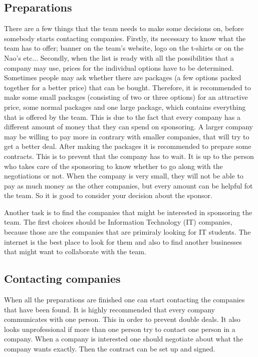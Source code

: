 \documentclass[a4paper]{article}
\begin{document}
\subsection{Preparations}
There are a few things that the team needs to make some decisions on, before somebody starts contacting companies. Firstly, its necessary to know what the team has to offer; banner on the team's website, logo on the t-shirts or on the Nao's etc... Secondly, when the list is ready with all the possibilities that a company may use, prices for the individual options have to be determined. Sometimes people may ask whether there are packages (a few options packed together for a better price) that can be bought. Therefore, it is recommended to make some small packages (consisting of two or three options) for an attractive price, some normal packages and one large package, which contains everything that is offered by the team. This is due to the fact that every company has a different amount of money that they can spend on sponsoring. A larger company may be willing to pay more in contrary with smaller companies, that will try to get a better deal. After making the packages it is recommended to prepare some contracts. This is to prevent that the company has to wait.  It is up to the person who takes care of the sponsoring to know whether to go along with the negotiations or not. When the company is very small, they will not be able to pay as much money as the other companies, but every amount can be helpful fot the team. So it is good to consider your decision about the sponsor.

Another task is to find the companies that might be interested in sponsoring the team. The first choices should be Information Technology (IT) companies, because those are the companies that are primiraly looking for IT students. The internet is the best place to look for them and also to find another businesses that might want to collaborate with the team.

\subsection{Contacting companies}
When all the preparations are finished one can start contacting the companies that have been found. It is highly recommended that every company communicates with one person. This in order to prevent double deals. It also looks unprofessional if more than one person try to contact one person in a company. When a company is interested one should negotiate about what the company wants exactly. Then the contract can be set up and signed.
\end{document}
